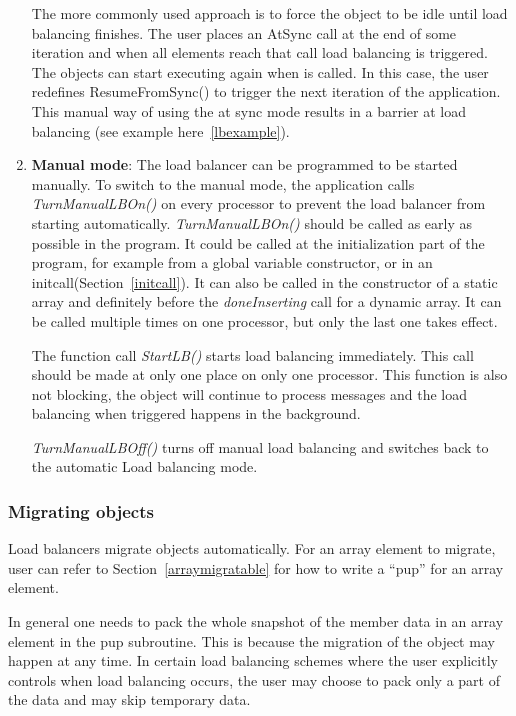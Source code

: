 \begin{enumerate}
The more commonly used approach is to force the object to be idle until load
balancing finishes. The user places an AtSync call at the end of some iteration
and when all elements reach that call load balancing is triggered. The objects
can start executing again when  is called. In this case,
the user redefines ResumeFromSync() to trigger the next iteration of the
application. This manual way of using the at sync mode results in a barrier at
load balancing (see example here~\ref{lbexample}).
%
\item {\bf Manual mode}: The load balancer can be programmed to be started
manually. To switch to the manual mode, the application calls {\em TurnManualLBOn()}
on every processor to prevent the load balancer from starting automatically. {\em
TurnManualLBOn()} should be called as early as possible in the program. It
could be called at the initialization part of the program, for example from a
global variable constructor, or in an initcall(Section~\ref{initcall}).  It can also be
called in the constructor of a static array and definitely before the {\em
doneInserting} call for a dynamic array.  It can be called multiple times on
one processor, but only the last one takes effect.

The function call {\em StartLB()} starts load balancing immediately. This call
should be made at only one place on only one processor. This function is also
not blocking, the object will continue to process messages and the load
balancing when triggered happens in the background.

{\em TurnManualLBOff()} turns off manual load balancing and switches back to
the automatic Load balancing mode.
%
\end{enumerate}

\subsubsection{Migrating objects}

\label{lbmigobj}

Load balancers migrate objects automatically.
For an array element to migrate, user can refer to Section~\ref{arraymigratable}
for how to write a ``pup'' for an array element.

In general one needs to pack the whole snapshot of the member data in an 
array element in the pup subroutine. This is because the migration of
the object may happen at any time. In certain load balancing schemes where
 the user explicitly controls when load balancing occurs, the user may choose
to pack only a part of the data and may skip temporary data.

